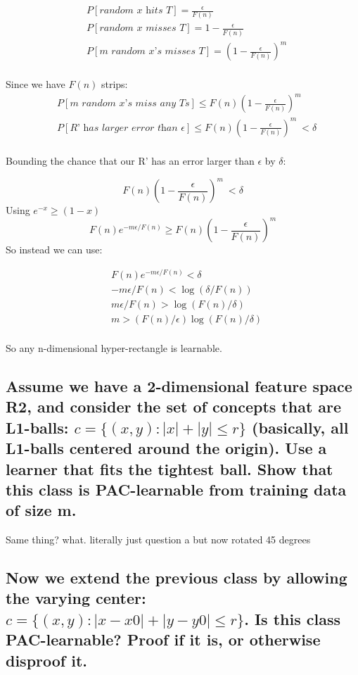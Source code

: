 \documentclass[11pt,a4paper]{article}
\begin{document}
\begin{align*} 
    &P[\textit{random x hits T}] = \frac{\epsilon}{F(n)} \\
    &P[\textit{random x misses T}] = 1 - \frac{\epsilon}{F(n)} \\
    &P[\textit{m random x's misses T}] = (1 - \frac{\epsilon}{F(n)})^m \\
\end{align*}

Since we have $F(n)$ strips:
\begin{align*} 
    &P[\textit{m random x's miss any Ts}] \leq F(n) (1 - \frac{\epsilon}{F(n)})^m \\
    &P[\textit{R' has larger error than } \epsilon] \leq F(n) (1 - \frac{\epsilon}{F(n)})^m\ < \delta \\
\end{align*}

Bounding the chance that our R' has an error larger than $\epsilon$ by $\delta$:

\[F(n) (1 - \frac{\epsilon}{F(n)})^m\ < \delta\]
Using $e^{-x} \geq (1-x)$
\[F(n)e^{-m\epsilon / F(n)} \geq F(n)(1 - \frac{\epsilon}{F(n)})^m\]
So instead we can use:

\begin{align*} 
    &F(n)e^{-m\epsilon / F(n)} < \delta \\ 
    &-m\epsilon / F(n) < \log{(\delta / F(n))} \\
    &m\epsilon / F(n) > \log{(F(n) / \delta)} \\
    &m > (F(n) / \epsilon)\log{(F(n) / \delta)} \\
\end{align*}

So any n-dimensional hyper-rectangle is learnable.

\subsection{Assume we have a 2-dimensional feature space R2, and consider the set of concepts that are L1-balls: $c = \{(x, y) : |x| + |y| ≤ r\}$ (basically, all L1-balls centered around the origin). Use a learner that fits the tightest ball. Show that this class is PAC-learnable from training data of size m.}

Same thing? what. literally just question a but now rotated 45 degrees

\subsection{Now we extend the previous class by allowing the varying center: $c = \{(x, y) : |x − x0| + |y − y0| ≤ r\}$. Is this class PAC-learnable? Proof if it is, or otherwise disproof it.}
\end{document}
